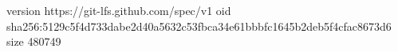version https://git-lfs.github.com/spec/v1
oid sha256:5129c5f4d733dabe2d40a5632c53fbca34e61bbbfc1645b2deb5f4cfac8673d6
size 480749
